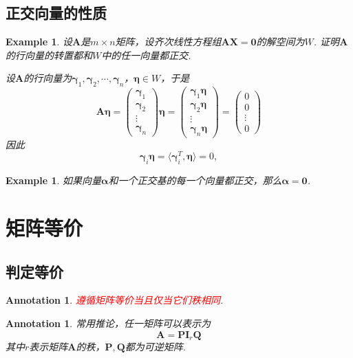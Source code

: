 \documentclass{article}
\newtheorem{example}[theorem]{Example}
\newtheorem{annotation}[theorem]{Annotation}
\newcommand{\hints}{{\color{blue} \text{hints}}}
\newcommand{\mbf}[1]{\bm{#1}}
\newcommand\inp[2]{\langle #1, #2 \rangle} %
\newcommand{\redt}[1]{\textcolor{red}{#1}}
\begin{document}
\subsection{正交向量的性质}

\begin{example}
\rm 设$\mbf{A}$是$m \times n$矩阵，设齐次线性方程组$\mbf{AX}=\mbf{0}$的解空间为$W$. 证明$\mbf{A}$的行向量的转置都和$W$中的任一向量都正交.

\hints 设$\mbf{A}$的行向量为$\mbf{\gamma}_1,\mbf{\gamma}_2,\cdots,\mbf{\gamma}_n$，$\mbf{\eta} \in W$，于是
$$
\mbf{A}\mbf{\eta} = \begin{pmatrix}
\mbf{\gamma}_1 \\
\mbf{\gamma}_2 \\
\vdots \\
\mbf{\gamma}_n
\end{pmatrix} \mbf{\eta} = 
\begin{pmatrix}
\mbf{\gamma}_1\mbf{\eta} \\
\mbf{\gamma}_2\mbf{\eta} \\
\vdots \\
\mbf{\gamma}_n\mbf{\eta}
\end{pmatrix} = \begin{pmatrix}
0 \\
0 \\
\vdots \\
0
\end{pmatrix}
$$
因此
$$
\mbf{\gamma}_i\mbf{\eta} = \inp{\mbf{\gamma}_i^T}{\mbf{\eta}} = 0,
$$
\end{example}

\begin{example}
\rm 如果向量$\mbf{\alpha}$和一个正交基的每一个向量都正交，那么$\mbf{\alpha} = \mbf{0}$. 
\end{example}

\newpage
\section{矩阵等价}

\subsection{判定等价}

\begin{annotation}
\rm \redt{遵循矩阵等价当且仅当它们秩相同}.
\end{annotation}

\begin{annotation}
\rm 常用推论，任一矩阵可以表示为
$$
\mbf{A} = \mbf{P} \mbf{I}_r \mbf{Q}
$$
其中$r$表示矩阵$\mbf{A}$的秩，$\mbf{P},\mbf{Q}$都为可逆矩阵. 
\end{annotation}
\end{document}

